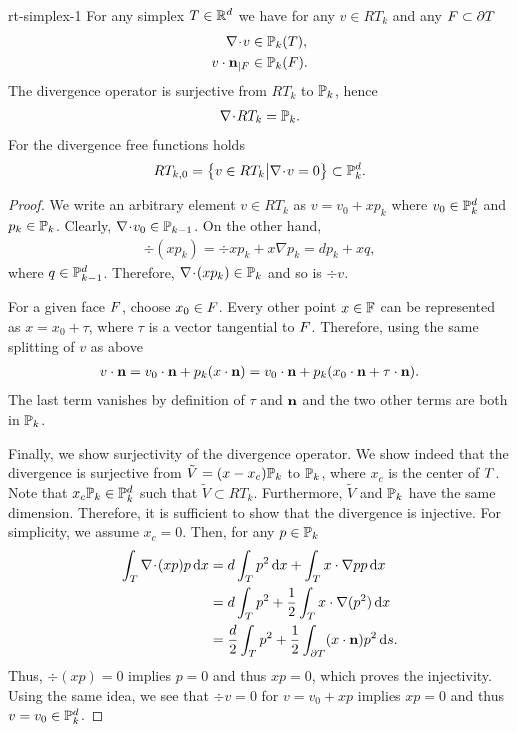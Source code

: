 \begin{Lemma}{rt-simplex-1}
  For any simplex $\cell\in\R^d$ we have for
  any $v\in RT_k$ and any $\face\subset\d\cell$
  \begin{align}
    \label{eq:darcy:21}
    \div v &\in \P_k(\cell), \\
    \label{eq:darcy:26}
    v\cdot\n_{|\face} &\in \P_k(\face).
  \end{align}
  The divergence operator is surjective from $RT_k$ to
  $\P_k$, hence
  \begin{gather}
    \label{eq:darcy:22}
    \div RT_k = \P_k.
  \end{gather}
  For the divergence free functions holds
  \begin{gather}
    \label{eq:darcy:24}
    RT_{k,0} = \bigl\{v\in RT_k \big\vert
    \div  v=0\bigr\} \subset \P_k^d.
  \end{gather}
\end{Lemma}

\begin{proof}
  We write an arbitrary element $v\in RT_k$ as $v=v_0+x p_k$ where
  $v_0\in \P_k^d$ and $p_k\in \P_k$. Clearly, $\div v_0 \in
  \P_{k-1}$. On the other hand,
  \begin{gather}
    \div (x p_k) = \div x p_k + x\nabla p_k = d p_k + x q,
  \end{gather}
  where $q\in \P_{k-1}^d$. Therefore, $\div(x p_k) \in \P_k$ and so is
  $\div v$.

  For a given face $\face$, choose $x_0\in\face$. Every other point
  $x\in \F$ can be represented as $x=x_0+ \tau$, where $\tau$ is a
  vector tangential to $\face$. Therefore, using the same splitting of
  $v$ as above
  \begin{gather}
    v\cdot\n = v_0\cdot\n + p_k (x\cdot\n)
    = v_0\cdot\n + p_k (x_0\cdot\n + \tau\cdot\n).
  \end{gather}
  The last term vanishes by definition of $\tau$ and $\n$ and the two
  other terms are both in $\P_k$.

  Finally, we show surjectivity of the divergence operator. We show
  indeed that the divergence is surjective from
  $\tilde V = (x-x_c)\P_k$ to $\P_k$, where $x_c$ is the center of
  $\cell$. Note that $x_c\P_k\in \P_k^d$ such that
  $\tilde V\subset RT_k$. Furthermore, $\tilde V$ and $\P_k$ have the
  same dimension. Therefore, it is sufficient to show that the
  divergence is injective. For simplicity, we assume $x_c=0$. Then,
  for any $p\in \P_k$
  \begin{align}
    \int_\cell \div (x p)p \dx
    &= d \int_\cell p^2\dx + \int_\cell x \cdot\nabla p p\dx
    \\
    &= d \int_\cell p^2 + \frac12 \int_\cell x \cdot\nabla(p^2)\dx
    \\
    &= \frac d2 \int_\cell p^2 + \frac12 \int_{\d\cell} (x\cdot\n) p^2\ds.
  \end{align}
  Thus, $\div(x p) = 0$ implies $p=0$ and thus $x p=0$, which proves the
  injectivity. Using the same idea, we see that $\div v=0$ for
  $v=v_0+x p$ implies $x p=0$ and thus $v=v_0\in\P_k^d$.
\end{proof}

